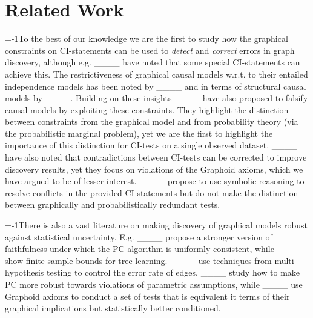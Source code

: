 \section{Related Work}
\looseness=-1To the best of our knowledge we are the first to study how the graphical constraints on CI-statements can be used to \emph{detect} and \emph{correct} errors in graph discovery, although e.g.  ____ have noted that some special CI-statements can achieve this.
The restrictiveness of graphical causal models w.r.t. to their entailed independence models has been noted by ____ and in terms of structural causal models by ____.
Building on these insights ____ have also proposed to falsify causal models by exploiting these constraints.
They highlight the distinction between constraints from the graphical model and from probability theory (via the probabilistic marginal problem),
yet we are the first to highlight the importance of this distinction for CI-tests on a single observed dataset.
____ have also noted that contradictions between CI-tests can be corrected to improve discovery results, yet they focus on violations of the Graphoid axioms, which we have argued to be of lesser interest.
____ propose to use symbolic reasoning to resolve conflicts in the provided CI-statements but do not make the distinction between graphically and probabilistically redundant tests.



\looseness=-1There is also a vast literature on making discovery of graphical models robust against statistical uncertainty.
E.g. ____ propose a stronger version of faithfulness under which the PC algorithm is uniformly consistent, while ____ show finite-sample bounds for tree learning.
____ use techniques from multi-hypothesis testing to control the error rate of edges. %
____ study how to make PC more robust towards violations of parametric assumptions, while ____ use Graphoid axioms to conduct a set of tests that is equivalent it terms of their graphical implications but statistically better conditioned.


